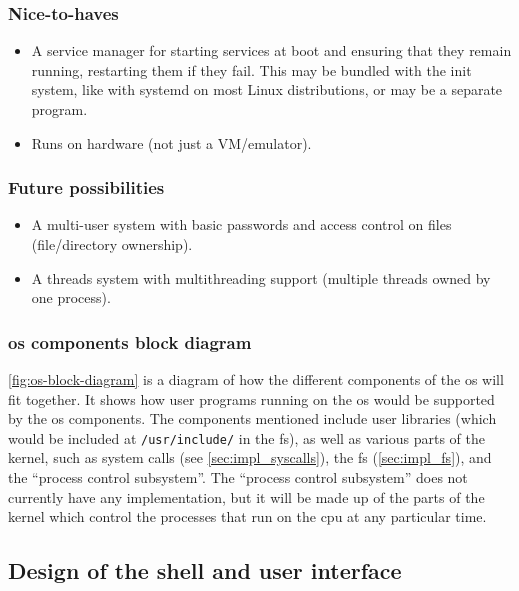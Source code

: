 \documentclass{article}
\begin{document}
\subsubsection{Nice-to-haves}
\begin{itemize}
    \item A service manager for starting services at boot and ensuring that
        they remain running, restarting them if they fail. This may be bundled
        with the init system, like with systemd on most Linux distributions, or
        may be a separate program.
    \item Runs on hardware (not just a VM/emulator).
\end{itemize}

\subsubsection{Future possibilities}
\begin{itemize}
    \item A multi-user system with basic passwords and access control on files
        (file/directory ownership).
    \item A threads system with multithreading support (multiple threads owned
        by one process).
\end{itemize}

\subsubsection{\texorpdfstring{\gls{os}}{OS} components block diagram}
\autoref{fig:os-block-diagram} is a diagram of how the different components of
the \gls{os} will fit together. It shows how user programs running on the
\gls{os} would be supported by the \gls{os} components. The components
mentioned include user libraries (which would be included at
\texttt{/usr/include/} in the \gls{fs}), as well as various parts of the
kernel, such as system calls (see \autoref{sec:impl_syscalls}), the \gls{fs}
(\autoref{sec:impl_fs}), and the ``process control subsystem''. The ``process
control subsystem'' does not currently have any implementation, but it will be
made up of the parts of the kernel which control the processes that run on the
\gls{cpu} at any particular time.



\subsection{Design of the shell and user interface}
\end{document}
